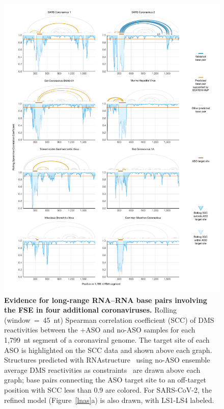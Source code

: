 \documentclass[main.tex]{subfiles}
\begin{document}
\begin{figure}[H]
	\includegraphics[width=\textwidth]{../MainFigures/covs/covs.pdf}
	\caption{\textbf{Evidence for long-range RNA--RNA base pairs involving the FSE in four additional coronaviruses.} Rolling (window~=~45~nt) Spearman correlation coefficient (SCC) of DMS reactivities between the +ASO and no-ASO samples for each 1,799~nt segment of a coronaviral genome. The target site of each ASO is highlighted on the SCC data and shown above each graph. Structures predicted with RNAstructure~\cite{Reuter2010} using no-ASO ensemble average DMS reactivities as constraints~\cite{Cordero2012} are drawn above each graph; base pairs connecting the ASO target site to an off-target position with SCC less than 0.9 are colored. For SARS-CoV-2, the refined model (Figure~\ref{lnas}a) is also drawn, with LS1-LS4 labeled.}
	\label{covs}
\end{figure}
\end{document}
